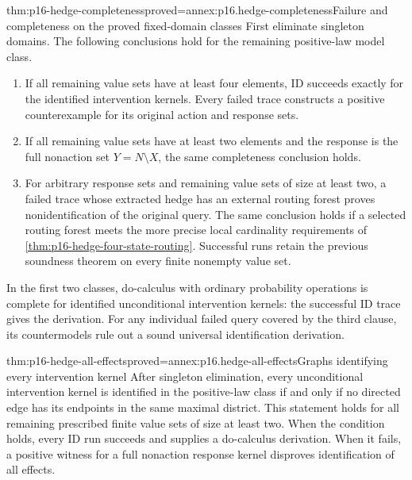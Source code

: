 \begin{hbtheorem}{thm:p16-hedge-completeness}{proved=annex:p16.hedge-completeness}{Failure and completeness on the proved fixed-domain classes}
First eliminate singleton domains. The following conclusions hold
for the remaining positive-law model class.
\begin{enumerate}
\item If all remaining value sets have at least four elements,
      ID succeeds exactly for the identified intervention kernels.
      Every failed trace constructs a positive counterexample for
      its original action and response sets.
\item If all remaining value sets have at least two elements and
      the response is the full nonaction set \(Y=N\setminus X\),
      the same completeness conclusion holds.
\item For arbitrary response sets and remaining value sets of size
      at least two, a failed trace whose extracted hedge has an
      external routing forest proves nonidentification of the
      original query. The same conclusion holds if a selected
      routing forest meets the more precise local cardinality
      requirements of \cref{thm:p16-hedge-four-state-routing}.
      Successful runs retain the previous soundness
      theorem on every finite nonempty value set.
\end{enumerate}
In the first two classes, do-calculus with ordinary probability
operations is complete for identified unconditional intervention
kernels: the successful ID trace gives the derivation.
For any individual failed query covered by the third clause, its
countermodels rule out a sound universal identification derivation.
\end{hbtheorem}

\begin{hbcorollary}{thm:p16-hedge-all-effects}{proved=annex:p16.hedge-all-effects}{Graphs identifying every intervention kernel}
After singleton elimination, every unconditional intervention kernel
is identified in the positive-law class if and only if no directed
edge has its endpoints in the same maximal district. This statement
holds for all remaining prescribed finite value sets of size at least
two. When the condition holds, every ID run succeeds and supplies
a do-calculus derivation. When it fails, a positive witness for a
full nonaction response kernel disproves identification of all effects.
\end{hbcorollary}

